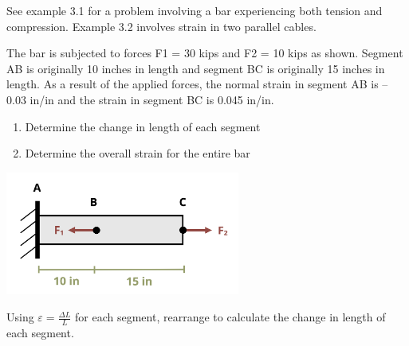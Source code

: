 \documentclass[
  letterpaper,
  DIV=11,
  numbers=noendperiod]{scrreprt}
\providecommand{\tightlist}{%
  \setlength{\itemsep}{0pt}\setlength{\parskip}{0pt}}\usepackage{longtable,booktabs,array}
\begin{document}
See example 3.1 for a problem involving a bar experiencing both tension
and compression. Example 3.2 involves strain in two parallel cables.

\begin{tcolorbox}[enhanced jigsaw, breakable, opacityback=0, toptitle=1mm, left=2mm, colback=white, opacitybacktitle=0.6, colframe=quarto-callout-tip-color-frame, titlerule=0mm, arc=.35mm, leftrule=.75mm, bottomtitle=1mm, colbacktitle=quarto-callout-tip-color!10!white, rightrule=.15mm, title={Example 3.1}, bottomrule=.15mm, toprule=.15mm, coltitle=black]

The bar is subjected to forces F1 = 30 kips and F2 = 10 kips as shown.
Segment AB is originally 10 inches in length and segment BC is
originally 15 inches in length. As a result of the applied forces, the
normal strain in segment AB is -- 0.03 in/in and the strain in segment
BC is 0.045 in/in.

\begin{enumerate}
\def\labelenumi{\arabic{enumi}.}
\tightlist
\item
  Determine the change in length of each segment
\item
  Determine the overall strain for the entire bar
\end{enumerate}

\begin{center}
\includegraphics[width=3.03125in,height=\textheight]{images/CH3 PNGs/example 3.1.png}
\end{center}

\begin{tcolorbox}[enhanced jigsaw, breakable, opacityback=0, toptitle=1mm, left=2mm, colback=white, opacitybacktitle=0.6, colframe=quarto-callout-tip-color-frame, titlerule=0mm, arc=.35mm, leftrule=.75mm, bottomtitle=1mm, colbacktitle=quarto-callout-tip-color!10!white, rightrule=.15mm, title={Solution}, bottomrule=.15mm, toprule=.15mm, coltitle=black]

Using \(\varepsilon=\frac{\Delta L}{L}\) for each segment, rearrange to
calculate the change in length of each segment.


\end{tcolorbox}
\end{tcolorbox}
\end{document}
